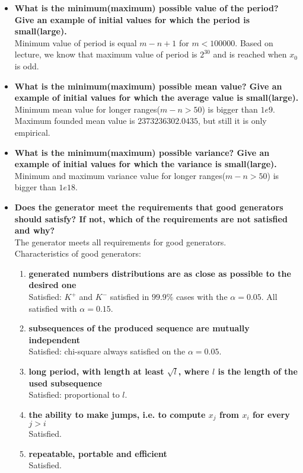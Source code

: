 \documentclass[a4paper,10pt]{article}
\begin{document}
\begin{itemize}
 \item \textbf{What is the minimum(maximum) possible value of the period? Give an example of initial values for which the period is small(large).} \\ 
Minimum value of period is equal $m-n + 1$ for $m<100000$.  Based on lecture, we know that maximum value of period is $2^30$ and is reached when $x_0$ is odd.

 \item \textbf{What is the minimum(maximum) possible mean value? Give an example of initial values for which the average value is small(large).} \\
Minimum mean value for longer ranges($m-n>50$) is bigger than $1e9$. Maximum founded mean value is $2373236302.0435$, but still it is only empirical.

 \item \textbf{What is the minimum(maximum) possible variance? Give an example of initial values for which the variance is small(large).} \\
Minimum and maximum variance value for longer ranges($m-n>50$) is bigger than $1e18$.

 \item \textbf{Does the generator meet the requirements that good generators should satisfy? If not, which of the requirements are not satisfied and why?} \\
  The generator meets all requirements for good generators. \\
  Characteristics of good generators:
   \begin{enumerate}
    \item \textbf{generated numbers distributions are as close as possible to the desired one} \\
    Satisfied: $K^+$ and $K^-$ satisfied in $99.9\%$ cases with the $\alpha = 0.05$. All satisfied with $\alpha = 0.15$.
    \item \textbf{subsequences of the produced sequence are mutually independent} \\
    Satisfied: chi-square always satisfied on the $\alpha = 0.05$.
    \item \textbf{long period, with length at least $\sqrt{l}$, where $l$ is the length of the used subsequence} \\
    Satisfied: proportional to $l$.
    \item \textbf{the ability to make jumps, i.e. to compute $x_j$ from $x_i$ for every $j > i$} \\
    Satisfied.
    \item \textbf{repeatable, portable and efficient} \\
    Satisfied.
   \end{enumerate}
 

\end{itemize}
\end{document}
